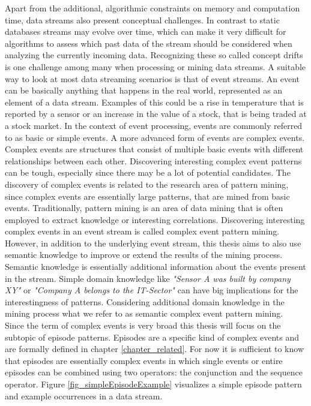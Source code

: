 Apart from the additional, algorithmic constraints on memory and computation time, data streams also present conceptual challenges. In contrast to static databases streams may evolve over time, which can make it very difficult for algorithms to assess which past data of the stream should be considered when analyzing the currently incoming data. Recognizing these so called concept drifts is one challenge among many when processing or mining data streams. \newline
A suitable way to look at most data streaming scenarios is that of event streams. An event can be basically anything that happens in the real world, represented as an element of a data stream. Examples of this could be a rise in temperature that is reported by a sensor or an increase in the value of a stock, that is being traded at a stock market. In the context of event processing, events are commonly referred to as basic or simple events. \newline
A more advanced form of events are complex events. Complex events are structures that consist of multiple basic events with different relationships between each other. Discovering interesting complex event patterns can be tough, especially since there may be a lot of potential candidates. The discovery of complex events is related to the research area of pattern mining, since complex events are essentially large patterns, that are mined from basic events. Traditionally, pattern mining is an area of data mining that is often employed to extract knowledge or interesting correlations. Discovering interesting complex events in an event stream is called complex event pattern mining. However, in addition to the underlying event stream, this thesis aims to also use semantic knowledge to improve or extend the results of the mining process. Semantic knowledge is essentially additional information about the events present in the stream. Simple domain knowledge like \textit{"Sensor A was built by company XY"} or \textit{"Company A belongs to the IT-Sector"} can have big implications for the interestingness of patterns. Considering additional domain knowledge in the mining process what we refer to as semantic complex event pattern mining. \\
Since the term of complex events is very broad this thesis will focus on the subtopic of episode patterns. Episodes are a specific kind of complex events and are formally defined in chapter \ref{chapter_related}. For now it is sufficient to know that episodes are essentially complex events in which single events or entire episodes can be combined using two operators: the conjunction and the sequence operator. Figure \ref{fig_simpleEpisodeExample} visualizes a simple episode pattern and example occurrences in a data stream.

